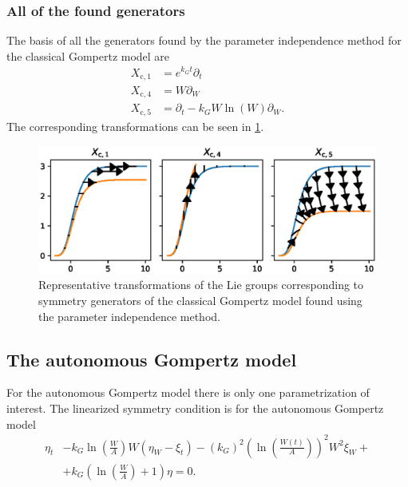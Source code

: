 \subsubsection{All of the found generators}
The basis of all the generators found by the parameter independence method for the classical Gompertz model are
\begin{align}
  X_{\text{c},1} &= e^{k_G t} \partial_t \\
  X_{\text{c},4} &= W \partial_W \\
  X_{\text{c},5} &= \partial_t - k_G W \ln(W) \partial_W.
\end{align}
The corresponding transformations can be seen in \cref{fig:gompertz-classical-param}.
\begin{figure}
  \centering
  \includegraphics[width=.96\textwidth]{images/gompertz-classical-param}
  \caption{Representative transformations of the Lie groups corresponding to symmetry generators of the classical Gompertz model found using the parameter independence method.}
  \label{fig:gompertz-classical-param}
\end{figure}


\subsection{The autonomous Gompertz model}

For the autonomous Gompertz model there is only one parametrization of interest.
The linearized symmetry condition  is for the autonomous Gompertz model
\begin{equation}\label{eq:gompertz-autonomous-lin-symmetry-cond}
  \begin{split}
    \eta_t &- k_G \ln(\frac{W}{A}) W\left(\eta_W - \xi_t\right) - (k_G)^2 \left(\ln(\frac{W(t)}{A})\right)^2 W^2 \xi_W +\\ &+ k_G \left(\ln(\frac{W}{A}) + 1\right) \eta = 0.
  \end{split}
\end{equation}

